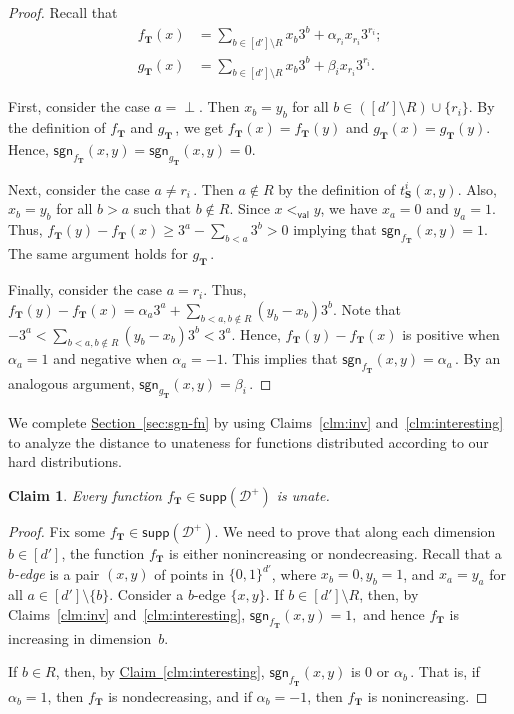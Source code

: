 \documentclass[11pt]{article}
\numberwithin{equation}{section}
\newtheorem{claim}[theorem]{Claim}
\theoremstyle{definition}
\theoremstyle{plain}
\newcommand{\expref}[2]{\hyperref[#2]{#1~\ref{#2}}}
\newcommand{\bS}{\ensuremath{\mathbf{S}}}
\newcommand{\bT}{\ensuremath{\mathbf{T}}}
\newcommand{\hypercube}{\ensuremath{\{0,1\}^\dd}}
\newcommand{\Yes}{\ensuremath{\mathcal{D}^+}}
\newcommand{\order}{\ensuremath{<_\dec}}
\newcommand{\coord}[2]{t^{#1}_{#2}}
\newcommand{\dd}{\ensuremath{{d'}}}
\newcommand{\dec}{\mathsf{val}}
\newcommand{\sgn}{\mathsf{sgn}}
\newcommand{\supp}{\mathsf{supp}}
\newcommand{\Sec}[1]{\expref{Section}{sec:#1}}
\newcommand{\Clm}[1]{\expref{Claim}{clm:#1}}
\begin{document}
\begin{proof}
Recall that
%
\begin{align*}
f_{\bT}(x) &= \sum_{b \in [\dd] \setminus R} x_b 3^b + \alpha_{r_i} x_{r_i} 3^{r_i};\\
g_{\bT}(x) &= \sum_{b \in [\dd] \setminus R} x_b 3^b + \beta_i x_{r_i} 3^{r_i}.
\end{align*}

First, consider the case $a = \perp$. Then $x_b = y_b$ for all $b \in ([\dd] \setminus R) \cup \{r_i\}$. 
By the definition of $f_\bT$ and $g_\bT$\,, %
we get $f_\bT (x) = f_\bT (y)$ and $g_\bT (x) = g_\bT (y)$. Hence, $\sgn_{f_{\bT}}(x,y) = \sgn_{g_{\bT}}(x,y) = 0$.

Next, consider the case $a \neq r_i$\,. %
Then $a \notin R$ by the definition of $\coord{i}{\bS}(x,y)$.
Also, $x_b = y_b$ for all $b > a$ such that $b \notin R$.
Since $x \order y$, we have $x_a = 0$ and $y_a = 1$. Thus,
$f_{\bT}(y) - f_{\bT}(x) \geq 3^a - \sum_{b < a} 3^b > 0$ implying that $\sgn_{f_{\bT}}(x,y)=1$.
The same argument holds for $g_{\bT}$\,. %

Finally, consider the case $a = r_i$. Thus,
$f_{\bT}(y) - f_{\bT}(x) = \alpha_a 3^a + \sum_{b < a, b \notin R} (y_b - x_b) 3^b$.
Note that $-3^a < \sum_{b < a, b \notin R} (y_b - x_b) 3^b < 3^a$.
Hence, $f_{\bT}(y) - f_{\bT}(x)$ is positive when $\alpha_a = 1$ and negative when $\alpha_a = -1$. This implies that  $\sgn_{f_{\bT}}(x,y)=\alpha_a$\,. %
%
%
%
By an analogous argument,  $\sgn_{g_{\bT}}(x,y) = \beta_i$\,. %
\end{proof}

We complete \Sec{sgn-fn} by using Claims~\ref{clm:inv} and~\ref{clm:interesting} to analyze the distance to unateness for functions distributed according to our hard distributions.
\begin{claim}\label{clm:yes}
Every function $f_{\bT} \in\supp(\Yes)$ is unate.
\end{claim}

\begin{proof}
Fix some $f_{\bT} \in \supp(\Yes)$.
We need to prove that along each dimension $b \in [d']$, the function ${f_{\bT}}$ is either nonincreasing or nondecreasing.
Recall that a \emph{$b$-edge} is a pair $(x,y)$ of points in $\hypercube$, where $x_b=0,y_b=1$, and $x_a=y_a$ for all $a\in [\dd] \setminus \{b\}$.
Consider a $b$-edge $\{x,y\}$. If $b \in [d']\setminus R$, then, by Claims~\ref{clm:inv} and~\ref{clm:interesting}, $\sgn_{f_{\bT}}(x,y)=1,$ and hence ${f_{\bT}}$ is increasing in dimension~$b$.

If $b\in R$, then, by \Clm{interesting}, $\sgn_{f_{\bT}}(x,y)$ is 0 or $\alpha_b$\,. %
That is, if $\alpha_b=1$, then $f_{\bT}$ is nondecreasing, and if $\alpha_b=-1$, then $f_{\bT}$ is nonincreasing.
%
%
%
%
%
%
%
%
%
%
\end{proof}
\end{document}
